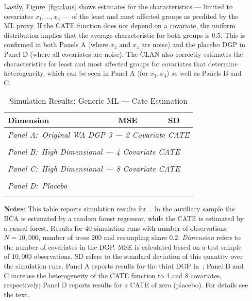 \documentclass[11pt, a4paper, leqno]{article}
\begin{document}
Lastly, Figure~\ref*{fig:clans} shows estimates for the characteristics --- limited to covariates $x_1, \ldots, x_4$ --- of the least and most affected groups as predited by the ML proxy.
If the CATE function does not depend on a covariate, the uniform distribution implies that the average characteristic for both groups is 0.5.
This is confirmed in both Panels A (where $x_3$ and $x_4$ are noise) and the placebo DGP in Panel D (where all covariates are noise).
The CLAN also correctly estimates the characteristics for least and most affected groups for covariates that determine heterogeneity, which can be seen in Panel A (for $x_3, x_4$) as well as Panels B and C.

\begin{table}
    \caption{Simulation Results: Generic ML --- Cate Estimation}\label{table:generic_ml_cate}
    \begin{threeparttable}
    \center
    \begin{tabular}{lcc}
        Dimension & MSE & SD \\
        \toprule
        \multicolumn{3}{l}{\textit{Panel A:\ Original WA DGP 3 --- 2 Covariate CATE}} \\
         \\
        \midrule

        \multicolumn{3}{l}{\textit{Panel B:\ High Dimensional --- 4 Covariate CATE}} \\
         \\
        \midrule

        \multicolumn{3}{l}{\textit{Panel C:\ High Dimensional --- 8 Covariate CATE}} \\
         \\
        \midrule

        \multicolumn{3}{l}{\textit{Panel D:\ Placebo}} \\
         \\
        \bottomrule
    \end{tabular}
    \begin{tablenotes}
        \small
        \item \textbf{Notes}: This table reports simulation results for~\cite{chernozhukov2023genml}.
        In the auxiliary sample the BCA is estimated by a random forest regressor, while the CATE is estimated by a causal forest.
        Results for $40$ simulation runs with number of observations $N=10,000$, number of trees $200$ and resampling share $0.2$.
        \textit{Dimension} refers to the number of covariates in the DGP\@.
        MSE is calculated based on a test sample of $10,000$ observations. SD refers to the standard deviation of this quantity over the simulation runs.
        Panel A reports results for the third DGP in~\cite{wager2018estimation}; Panel B and C increase the heterogeneity of the CATE function to 4 and 8 covariates, respectively; Panel D reports results for a CATE of zero (placebo).
        For details see the text.
    \end{tablenotes}
\end{threeparttable}


\end{table}
\end{document}

